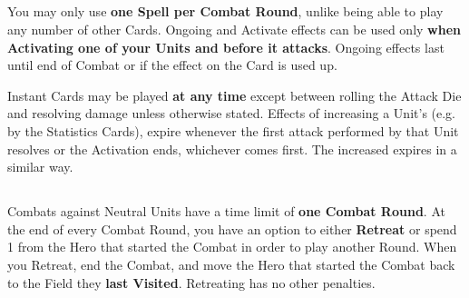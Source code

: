 \begin{multicols*}{2}
\subsection*{}
You may only use \textbf{one Spell per Combat Round}, unlike being able to play any number of other Cards.
Ongoing  and  Activate effects can be used only \textbf{when Activating one of your Units and before it attacks}.
Ongoing effects last until end of Combat or if the effect on the Card is used up.\par
Instant  Cards may be played \textbf{at any time} except between rolling the Attack Die and resolving damage unless otherwise stated.
Effects of increasing a Unit's  (e.g. by the Statistics Cards), expire whenever the first attack performed by that Unit resolves or the Activation ends, whichever comes first.
The increased  expires in a similar way.

\vspace*{\fill}
\begin{center}
\end{center}
\vspace*{\fill}

\subsection*{}
Combats against Neutral Units have a time limit of \textbf{one Combat Round}.
At the end of every Combat Round, you have an option to either \textbf{Retreat} or spend 1  from the Hero that started the Combat in order to play another Round.
When you Retreat, end the Combat, and move the Hero that started the Combat back to the Field they \textbf{last Visited}.
Retreating has no other penalties.

\end{multicols*}

